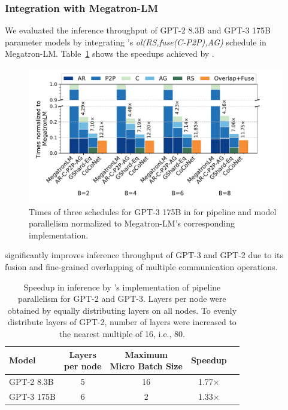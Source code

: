 \subsubsection{Integration with Megatron-LM}
\label{sec:experiments:pipeline-parallel:integeration}
We evaluated the inference throughput of GPT-2 8.3B and GPT-3 175B parameter models by integrating \tool's \textit{ol(RS,fuse(C-P2P),AG)} schedule in Megatron-LM.
Table~\ref{tab:pipeline-results} shows the speedups achieved by \tool.
\begin{figure}[t]
	\centering
  \includegraphics[width=1\linewidth]{figures/p2p-fusion-break-down-256-cluster_V100.pdf}
  \caption{Times of three schedules for GPT-3 175B in \tool for pipeline and model parallelism normalized to Megatron-LM's corresponding implementation. \label{fig:pipeline-overlap}}
\end{figure}

\tool significantly improves inference throughput of GPT-3 and GPT-2 due to its fusion and fine-grained overlapping of multiple communication operations.
\begin{table}[t]
  \caption{Speedup in inference by \tool's implementation of pipeline parallelism for GPT-2 and GPT-3.
  Layers per node were obtained by equally distributing layers on all nodes.
  To evenly distribute layers of GPT-2, number of layers were increased to the nearest multiple of 16, i.e., 80.
  \label{tab:pipeline-results}}
  \begin{tabular}{lcccc}
    Model & \thead{Layers \\per node} & \thead{Maximum \\ Micro Batch Size} & Speedup \\
    \midrule
    GPT-2 8.3B & 5 & 16 & 1.77$\times$\\
    GPT-3 175B & 6 & 2 & 1.33$\times$\\
  \end{tabular} 
  \par \bigskip%
  \end{table}